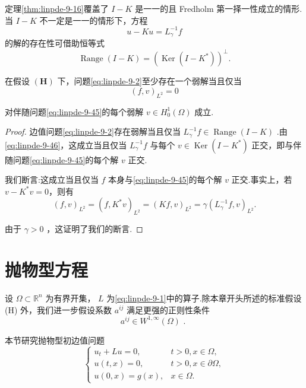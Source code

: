 定理\ref{thm:linpde-9-16}覆盖了 $I - K$ 是一一的且 Fredholm 第一择一性成立的情形.当 $I - K$ 不一定是一一的情形下，方程
\[
u - {Ku} = {L}_{\gamma }^{-1}f
\]
的解的存在性可借助恒等式
\begin{equation}\tag{9.46}\label{eq:linpde-9-46}
\operatorname{Range}\left( {I - K}\right)  = {\left(  \operatorname{Ker}\left( I - {K}^{ * }\right) \right)  }^{ \bot  }.
\end{equation}

\begin{theorem}\label{thm:linpde-9-17}
在假设 $\left( \bm{H}\right)$ 下，问题\eqref{eq:linpde-9-2}至少存在一个弱解当且仅当
\begin{equation}\tag{9.47}\label{eq:linpde-9-47}
{\left( f,v\right) }_{{L}^{2}} = 0
\end{equation}

对伴随问题\eqref{eq:linpde-9-45}的每个弱解 $v \in  {H}_{0}^{1}\left( \Omega \right)$ 成立.
\end{theorem}

\begin{proof}
边值问题\eqref{eq:linpde-9-2}存在弱解当且仅当 ${L}_{\gamma }^{-1}f \in  \operatorname{Range}\left( {I - K}\right)$ .由\eqref{eq:linpde-9-46}，这成立当且仅当 ${L}_{\gamma }^{-1}f$ 与每个 $v \in  \operatorname{Ker}\left( {I - {K}^{ * }}\right)$ 正交，即与伴随问题\eqref{eq:linpde-9-45}的每个解 $v$ 正交.

我们断言:这成立当且仅当 $f$ 本身与\eqref{eq:linpde-9-45}的每个解 $v$ 正交.事实上，若 $v - {K}^{ * }v = 0$，则有
\[
{\left( f,v\right) }_{{L}^{2}} = {\left( f,{K}^{ * }v\right) }_{{L}^{2}} = {\left( Kf,v\right) }_{{L}^{2}} = \gamma {\left( {L}_{\gamma }^{-1}f,v\right) }_{{L}^{2}}.
\]

由于 $\gamma  > 0$ ，这证明了我们的断言.
\end{proof}

\section{抛物型方程}

设 $\Omega  \subset  {\mathbb{R}}^{n}$ 为有界开集， $L$ 为\eqref{eq:linpde-9-1}中的算子.除本章开头所述的标准假设 (H) 外，我们进一步假设系数 ${a}^{ij}$ 满足更强的正则性条件
\begin{equation}\tag{9.48}\label{eq:linpde-9-48}
{a}^{ij} \in  {W}^{1,\infty }\left( \Omega \right) \text{ . }
\end{equation}

本节研究抛物型初边值问题
\begin{equation}\tag{9.49}\label{eq:linpde-9-49}
\begin{cases} {u}_{t} + {Lu} = 0, &  t > 0,x \in  \Omega , \\[-1pt]  u\left( {t,x}\right)  = 0, & t > 0,x \in  \partial \Omega , \\[-1pt]  u\left( {0,x}\right) = g\left( x\right) , & x \in  \Omega . \end{cases}
\end{equation}

